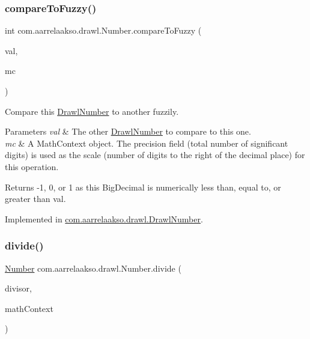\subsubsection{\texorpdfstring{compare\+To\+Fuzzy()}{compareToFuzzy()}\hspace{0.1cm}{\footnotesize\ttfamily [2/2]}}
{\footnotesize\ttfamily int com.\+aarrelaakso.\+drawl.\+Number.\+compare\+To\+Fuzzy (\begin{DoxyParamCaption}\item[{@Not\+Null final \hyperlink{interfacecom_1_1aarrelaakso_1_1drawl_1_1_number}{Number}}]{val,  }\item[{final Math\+Context}]{mc }\end{DoxyParamCaption})}



Compare this \hyperlink{classcom_1_1aarrelaakso_1_1drawl_1_1_drawl_number}{Drawl\+Number} to another fuzzily. 


\begin{DoxyParams}{Parameters}
{\em val} & The other \hyperlink{classcom_1_1aarrelaakso_1_1drawl_1_1_drawl_number}{Drawl\+Number} to compare to this one. \\
\hline
{\em mc} & A Math\+Context object. The precision field (total number of significant digits) is used as the scale (number of digits to the right of the decimal place) for this operation. \\
\hline
\end{DoxyParams}
\begin{DoxyReturn}{Returns}
-\/1, 0, or 1 as this Big\+Decimal is numerically less than, equal to, or greater than val. 
\end{DoxyReturn}


Implemented in \hyperlink{classcom_1_1aarrelaakso_1_1drawl_1_1_drawl_number_a67bb221c313ba22d920db646d130d66f}{com.\+aarrelaakso.\+drawl.\+Drawl\+Number}.

\mbox{\label{interfacecom_1_1aarrelaakso_1_1drawl_1_1_number_adfd6e1a6e96cbface21eef9b2d8860d0}} 
\subsubsection{\texorpdfstring{divide()}{divide()}\hspace{0.1cm}{\footnotesize\ttfamily [1/3]}}
{\footnotesize\ttfamily \hyperlink{interfacecom_1_1aarrelaakso_1_1drawl_1_1_number}{Number} com.\+aarrelaakso.\+drawl.\+Number.\+divide (\begin{DoxyParamCaption}\item[{@Not\+Null final \hyperlink{interfacecom_1_1aarrelaakso_1_1drawl_1_1_number}{Number}}]{divisor,  }\item[{final Math\+Context}]{math\+Context }\end{DoxyParamCaption})}



